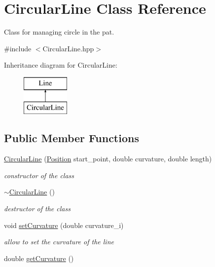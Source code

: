 \hypertarget{class_circular_line}{}\section{Circular\+Line Class Reference}
\label{class_circular_line}


Class for managing circle in the pat.  




{\ttfamily \#include $<$Circular\+Line.\+hpp$>$}

Inheritance diagram for Circular\+Line\+:\begin{figure}[H]
\begin{center}
\leavevmode
\includegraphics[height=2.000000cm]{class_circular_line}
\end{center}
\end{figure}
\subsection*{Public Member Functions}
\begin{DoxyCompactItemize}
\item 
\mbox{\hyperlink{class_circular_line_aacb17f31ed3eb9fbe66fbe2a95b20e6a}{Circular\+Line}} (\mbox{\hyperlink{class_position}{Position}} start\+\_\+point, double curvature, double length)
\begin{DoxyCompactList}\small\item\em constructor of the class \end{DoxyCompactList}\item 
\mbox{\label{class_circular_line_a2f8c59281cb51a6072b6980b6df9be89}} 
\mbox{\hyperlink{class_circular_line_a2f8c59281cb51a6072b6980b6df9be89}{$\sim$\+Circular\+Line}} ()
\begin{DoxyCompactList}\small\item\em destructor of the class \end{DoxyCompactList}\item 
\mbox{\label{class_circular_line_a521ac7d10eca4ea8914465c5eea90d8d}} 
void \mbox{\hyperlink{class_circular_line_a521ac7d10eca4ea8914465c5eea90d8d}{set\+Curvature}} (double curvature\+\_\+i)
\begin{DoxyCompactList}\small\item\em allow to set the curvature of the line \end{DoxyCompactList}\item 
double \mbox{\hyperlink{class_circular_line_ab5bad8246cee1a80c1e625c68c0b2c15}{get\+Curvature}} ()
\end{DoxyCompactItemize}



